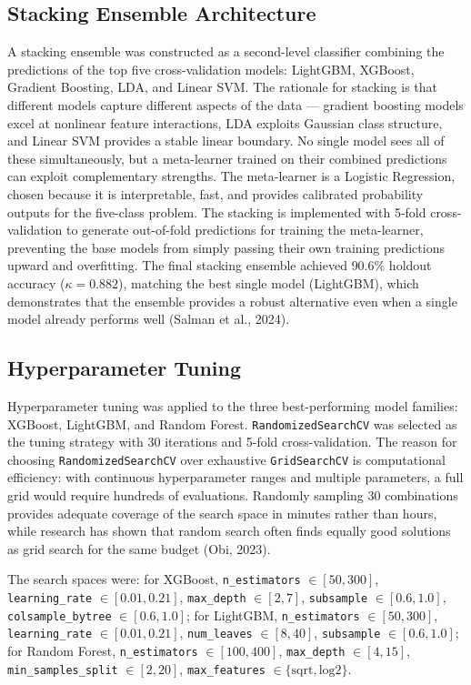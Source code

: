\documentclass[12pt, oneside]{article} %
\begin{document}
\subsection{Stacking Ensemble Architecture}

A stacking ensemble was constructed as a second-level classifier combining the predictions of the top five cross-validation models: LightGBM, XGBoost, Gradient Boosting, LDA, and Linear SVM. The rationale for stacking is that different models capture different aspects of the data --- gradient boosting models excel at nonlinear feature interactions, LDA exploits Gaussian class structure, and Linear SVM provides a stable linear boundary. No single model sees all of these simultaneously, but a meta-learner trained on their combined predictions can exploit complementary strengths. The meta-learner is a Logistic Regression, chosen because it is interpretable, fast, and provides calibrated probability outputs for the five-class problem. The stacking is implemented with 5-fold cross-validation to generate out-of-fold predictions for training the meta-learner, preventing the base models from simply passing their own training predictions upward and overfitting. The final stacking ensemble achieved $90.6\%$ holdout accuracy ($\kappa = 0.882$), matching the best single model (LightGBM), which demonstrates that the ensemble provides a robust alternative even when a single model already performs well (Salman et al., 2024).


\subsection{Hyperparameter Tuning}

Hyperparameter tuning was applied to the three best-performing model families: XGBoost, LightGBM, and Random Forest. \texttt{RandomizedSearchCV} was selected as the tuning strategy with 30 iterations and 5-fold cross-validation. The reason for choosing \texttt{RandomizedSearchCV} over exhaustive \texttt{GridSearchCV} is computational efficiency: with continuous hyperparameter ranges and multiple parameters, a full grid would require hundreds of evaluations. Randomly sampling 30 combinations provides adequate coverage of the search space in minutes rather than hours, while research has shown that random search often finds equally good solutions as grid search for the same budget (Obi, 2023).

The search spaces were: for XGBoost, \texttt{n\_estimators} $\in [50, 300]$, \texttt{learning\_rate} $\in [0.01, 0.21]$, \texttt{max\_depth} $\in [2, 7]$, \texttt{subsample} $\in [0.6, 1.0]$, \texttt{colsample\_bytree} $\in [0.6, 1.0]$; for LightGBM, \texttt{n\_estimators} $\in [50, 300]$, \texttt{learning\_rate} $\in [0.01, 0.21]$, \texttt{num\_leaves} $\in [8, 40]$, \texttt{subsample} $\in [0.6, 1.0]$; for Random Forest, \texttt{n\_estimators} $\in [100, 400]$, \texttt{max\_depth} $\in [4, 15]$, \texttt{min\_samples\_split} $\in [2, 20]$, \texttt{max\_features} $\in \{\text{sqrt}, \text{log2}\}$.
\end{document}
